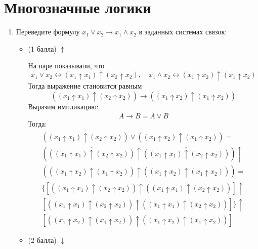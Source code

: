 \section{Многозначные логики}
\begin{enumerate}
  \item Переведите формулу $x_1 \lor x_2 \rightarrow x_1 \land x_2$ в заданных системах связок:
  \begin{itemize}
    \item (1 балла) $\uparrow$
    \begin{solution}
      На паре показывали, что
      \begin{equation}
        x_1 \lor x_2 \leftrightarrow (x_1 \uparrow x_1) \uparrow (x_2 \uparrow x_2), \quad x_1 \land x_2 \leftrightarrow (x_1 \uparrow x_2) \uparrow (x_1 \uparrow x_2)
      \end{equation}
      Тогда выражение становится равным
      \begin{equation}
        ((x_1 \uparrow x_1) \uparrow (x_2 \uparrow x_2)) \rightarrow ((x_1 \uparrow x_2) \uparrow (x_1 \uparrow x_2))
      \end{equation}
      Выразим импликацию:
      \begin{equation}
        A \rightarrow B = \overline{A} \lor B
      \end{equation}
      Тогда:
      \begin{eqnarray}
        \overline{((x_1 \uparrow x_1) \uparrow (x_2 \uparrow x_2))} \lor ((x_1 \uparrow x_2) \uparrow (x_1 \uparrow x_2)) = \\
        (\overline{((x_1 \uparrow x_1) \uparrow (x_2 \uparrow x_2))} \uparrow \overline{((x_1 \uparrow x_1) \uparrow (x_2 \uparrow x_2))}) \uparrow \\ (((x_1 \uparrow x_2) \uparrow (x_1 \uparrow x_2)) \uparrow ((x_1 \uparrow x_2) \uparrow (x_1 \uparrow x_2))) = \\
        \{[((x_1 \uparrow x_1) \uparrow (x_2 \uparrow x_2)) \uparrow ((x_1 \uparrow x_1) \uparrow (x_2 \uparrow x_2))] \uparrow \\ \left[((x_1 \uparrow x_1) \uparrow (x_2 \uparrow x_2)) \uparrow ((x_1 \uparrow x_1) \uparrow (x_2 \uparrow x_2))\right]\} \uparrow \\ \left[((x_1 \uparrow x_2) \uparrow (x_1 \uparrow x_2)) \uparrow ((x_1 \uparrow x_2) \uparrow (x_1 \uparrow x_2))\right]
      \end{eqnarray}
    \end{solution}
    \item (2 балла) $\downarrow$

\end{itemize}
\end{enumerate}
